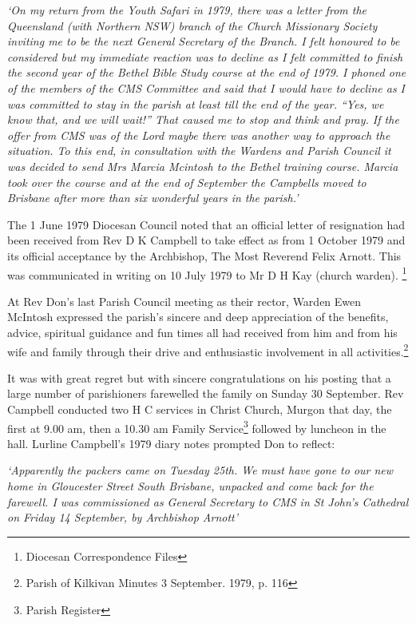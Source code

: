 \emph{`On my return from the Youth Safari in 1979, there was a letter from the Queensland (with Northern NSW) branch of the Church Missionary Society inviting me to be the next General Secretary of the Branch. I felt honoured to be considered but my immediate reaction was to decline as I felt committed to finish the second year of the Bethel Bible Study course at the end of 1979. I phoned one of the members of the CMS Committee and said that I would have to decline as I was committed to stay in the parish at least till the end of the year. ``Yes, we know that, and we will wait!'' That caused me to stop and think and pray. If the offer from CMS was of the Lord maybe there was another way to approach the situation. To this end, in consultation with the Wardens and Parish Council it was decided to send Mrs Marcia Mcintosh to the Bethel training course. Marcia took over the course and at the end of September the Campbells moved to Brisbane after more than six wonderful years in the parish.'}

The 1 June 1979 Diocesan Council noted that an official letter of resignation had been received from Rev D K Campbell to take effect as from 1 October 1979 and its official acceptance by the Archbishop, The Most Reverend Felix Arnott. This was communicated in writing on 10 July 1979 to Mr D H Kay (church warden). \footnote{Diocesan Correspondence Files}

At Rev Don's last Parish Council meeting as their rector, Warden Ewen McIntosh expressed the parish's sincere and deep appreciation of the benefits, advice, spiritual guidance and fun times all had received from him and from his wife and family through their drive and enthusiastic involvement in all activities.\footnote{Parish of Kilkivan Minutes 3 September. 1979, p. 116}

It was with great regret but with sincere congratulations on his posting that a large number of parishioners farewelled the family on Sunday 30 September. Rev Campbell conducted two H C services in Christ Church, Murgon that day, the first at 9.00 am, then a 10.30 am Family Service\footnote{Parish Register} followed by luncheon in the hall. Lurline Campbell's 1979 diary notes prompted Don to reflect:

\emph{`Apparently the packers came on Tuesday 25th. We must have gone to our new home in Gloucester Street South Brisbane, unpacked and come back for the farewell. I was commissioned as General Secretary to CMS in St John's Cathedral on Friday 14 September, by Archbishop Arnott'}

